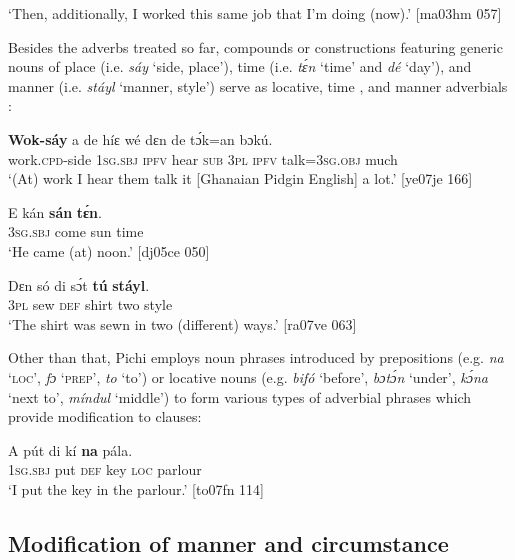 \glt ‘Then, additionally, I worked this same job that I’m doing (now).’ [ma03hm 057]
\z

Besides the adverbs treated so far, compounds  or constructions featuring generic nouns of place (i.e. \textit{sáy} ‘side, place’), time (i.e. \textit{tɛ́n} ‘time’ and \textit{dé} ‘day’), and manner (i.e. \textit{stáyl} ‘manner, style’) serve as locative{\fff}, time , and manner adverbials :


\ea%
    \label{ex:key:873}
    \gll \textbf{Wok-sáy}    a    de  híɛ    wé  dɛn  de  tɔ́k=an    bɔkú.\\
work.\textsc{cpd}{}-side  \textsc{1sg.sbj}  \textsc{ipfv}  hear    \textsc{sub}  \textsc{3pl}  \textsc{ipfv}  talk=\textsc{3sg.obj}  much\\

\glt ‘(At) work I hear them talk it [Ghanaian Pidgin English] a lot.’ [ye07je 166]
\z


\ea%
    \label{ex:key:874}
    \gll E    kán    \textbf{sán}  \textbf{tɛ́n}.\\
\textsc{3sg.sbj}  come  sun  time\\

\glt ‘He came (at) noon.’ [dj05ce 050]
\z


\ea%
    \label{ex:key:875}
    \gll Dɛn  só  di  sɔ́t    \textbf{tú}  \textbf{stáyl}.\\
\textsc{3pl}  sew  \textsc{def}  shirt  two  style\\

\glt ‘The shirt was sewn in two (different) ways.’ [ra07ve 063]
\z

Other than that, Pichi employs noun phrases introduced by prepositions (e.g. \textit{na} ‘\textsc{loc}’, \textit{fɔ} ‘\textsc{prep}’, \textit{to} ‘to’) or locative nouns (e.g. \textit{bifó} ‘before’, \textit{bɔtɔ́n} ‘under’, \textit{kɔ́na} ‘next to’, \textit{míndul} ‘middle’) to form various types of adverbial phrases which provide modification to clauses: 


\ea%
    \label{ex:key:876}
    \gll \MakeUppercase{A}   pút  di  kí  \textbf{na} pála.\\
\textsc{1sg.sbj}  put  \textsc{def}  key  \textsc{loc}  parlour\\

\glt ‘I put the key in the parlour.’ [to07fn 114]
\z

\subsection{Modification of manner and circumstance}\label{sec:7.7.2}

